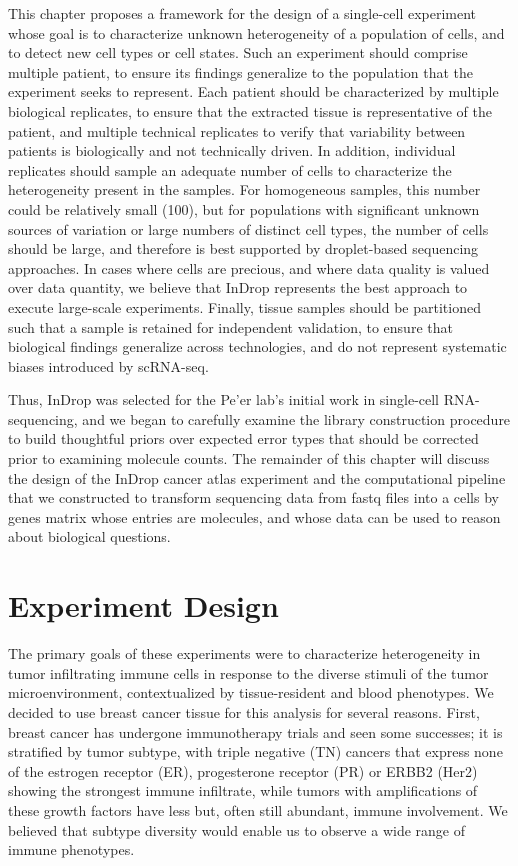 This chapter proposes a framework for the design of a single-cell experiment whose goal is to characterize unknown heterogeneity of a population of cells, and to detect new cell types or cell states. 
Such an experiment should comprise multiple patient, to ensure its findings generalize to the population that the experiment seeks to represent. 
Each patient should be characterized by multiple biological replicates, to ensure that the extracted tissue is representative of the patient, and multiple technical replicates to verify that variability between patients is biologically and not technically driven. 
In addition, individual replicates should sample an adequate number of cells to characterize the heterogeneity present in the samples. 
For homogeneous samples, this number could be relatively small (100), but for populations with significant unknown sources of variation or large numbers of distinct cell types, the number of cells should be large, and therefore is best supported by droplet-based sequencing approaches.
In cases where cells are precious, and where data quality is valued over data quantity, we believe that InDrop represents the best approach to execute large-scale experiments. 
Finally, tissue samples should be partitioned such that a sample is retained for independent validation, to ensure that biological findings generalize across technologies, and do not represent systematic biases introduced by scRNA-seq. 

Thus, InDrop was selected for the Pe’er lab’s initial work in single-cell RNA-sequencing, and we began to carefully examine the library construction procedure to build thoughtful priors over expected error types that should be corrected prior to examining molecule counts. 
The remainder of this chapter will discuss the design of the InDrop cancer atlas experiment and the computational pipeline that we constructed to transform sequencing data from fastq files into a cells by genes matrix whose entries are molecules, and whose data can be used to reason about biological questions. 

\section{Experiment Design}

The primary goals of these experiments were to characterize heterogeneity in tumor infiltrating immune cells in response to the diverse stimuli of the tumor microenvironment, contextualized by tissue-resident and blood phenotypes. 
We decided to use breast cancer tissue for this analysis for several reasons.
First, breast cancer has undergone immunotherapy trials and seen some successes; it is stratified by tumor subtype, with triple negative (TN) cancers that express none of the estrogen receptor (ER), progesterone receptor (PR) or ERBB2 (Her2) showing the strongest immune infiltrate, while tumors with amplifications of these growth factors have less but, often still abundant, immune involvement.
We believed that subtype diversity would enable us to observe a wide range of immune phenotypes. 

